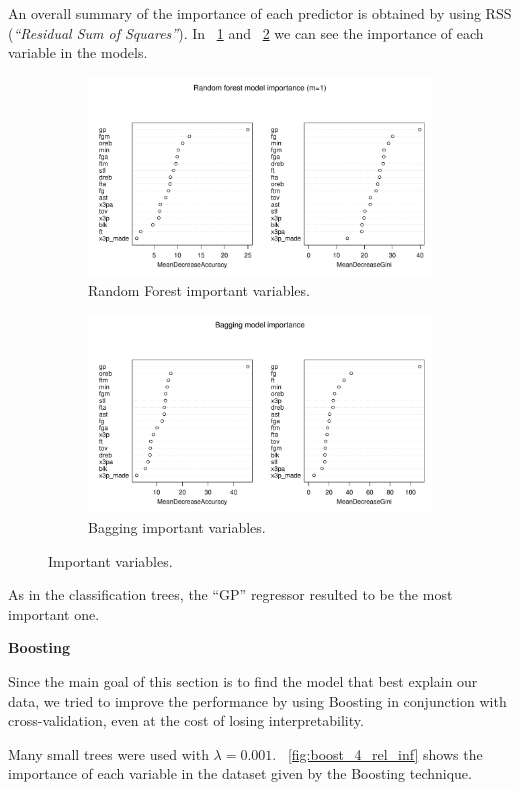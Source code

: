 An overall summary of the importance of each predictor is obtained by using RSS (\textit{``Residual Sum of Squares''}). In \Fig~\ref{fig:best_for_500_var_imp_plot} and \Fig~\ref{fig:bagg_500_var_imp_plot} we can see the importance of each variable in the models.

\begin{figure}[h]
	\centering
	\begin{subfigure}{.5\textwidth}
		\centering
		\includegraphics[width=0.5\linewidth]{ImageFiles/Classification/Trees/best_for_500_var_imp_plot}
		\caption{Random Forest important variables.}
		\label{fig:best_for_500_var_imp_plot}
	\end{subfigure}%
	\hfill
	\begin{subfigure}{.5\textwidth}
		\centering
		\includegraphics[width=0.5\linewidth]{ImageFiles/Classification/Trees/bagg_500_var_imp_plot}
		\caption{Bagging important variables.}
		\label{fig:bagg_500_var_imp_plot}
	\end{subfigure}
	\caption{Important variables.}
	\label{fig:ImpVar}
\end{figure}

\noindent
As in the classification trees, the ``GP'' regressor resulted to be the most important one.

\vspace{0.2cm}
\noindent
\textbf{Boosting}

Since the main goal of this section is to find the model that best explain our data, we tried to improve the performance by using Boosting in conjunction with cross-validation, even at the cost of losing interpretability. 

Many small trees were used with $\lambda = 0.001$. \Fig~\ref{fig:boost_4_rel_inf} shows the importance of each variable in the dataset given by the Boosting technique.

